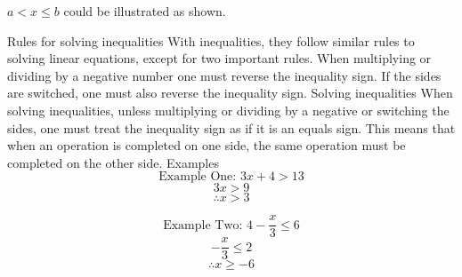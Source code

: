 \begin{outline}
\begin{center}
\end{center}
		\2 $a < x \leq b$ could be illustrated as shown.
\begin{center}
\end{center}
	\1 Rules for solving inequalities
		\2 With inequalities, they follow similar rules to solving linear equations, except for two important rules. When multiplying or dividing by a negative number one must reverse the inequality sign. If the sides are switched, one must also reverse the inequality sign.
	\1 Solving inequalities
		\2 When solving inequalities, unless multiplying or dividing by a negative or switching the sides, one must treat the inequality sign as if it is an equals sign. This means that when an operation is completed on one side, the same operation must be completed on the other side.
			\3 Examples
				\[\text{Example One: }3x + 4 > 13\]
				\[3x > 9\]
				\[\therefore x > 3\]
				
				\[\text{Example Two: }4-\frac{x}{3}\leq 6\]
				\[-\frac{x}{3}\leq 2\]
				\[\therefore x \geq -6\]

\0

\end{outline}

